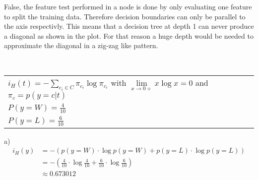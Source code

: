 %
%
%
\begin{flushleft}
False, the feature test performed in a node is done by only evaluating one feature to split the training data. Therefore decision boundaries can only be parallel to the axis respectivly. This means that a decision tree at depth 1 can never produce a diagonal as shown in the plot. For that reason a huge depth would be needed to approximate the diagonal in a zig-zag like pattern.
\end{flushleft}
%
%
%
\\
\begin{table}[!h]
\begin{tabular}{ll}
  $i_H(t) = - \sum_{c_i \in C} \pi_{c_i} \log \pi_{c_i}$ with $\underset{x\rightarrow 0+}{\lim} x\log x = 0$ and $\pi_c = p(y=c|t)$ \\
  $P(y=W) = \frac{4}{10}$ \\
  $P(y=L) = \frac{6}{10}$
\end{tabular}
\end{table}
\begin{flushleft}
  a) 
  \begin{align*}
    i_H(y) &= - (p(y=W) \cdot \log p(y=W) + p(y=L) \cdot \log p(y=L)) \\
    &= -(\frac{4}{10} \cdot \log \frac{4}{10} + \frac{6}{10} \cdot \log \frac{6}{10}) \\
    &\approx 0.673012
  \end{align*}
\end{flushleft}
